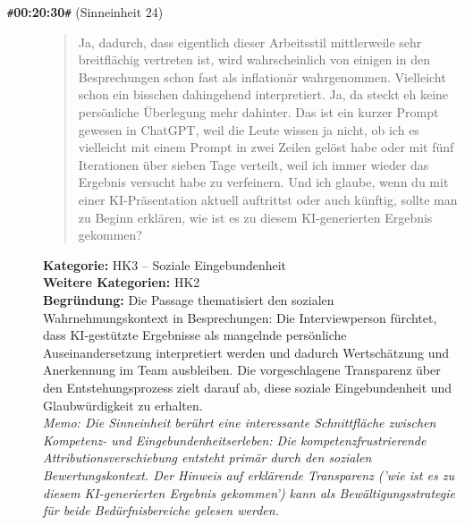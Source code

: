 \begin{description}
  \item[\texttt{\#}\textbf{00:20:30}\texttt{\#} (Sinneinheit 24)]
  \begin{quote}
  Ja, dadurch, dass eigentlich dieser Arbeitsstil mittlerweile sehr breitflächig vertreten ist, wird wahrscheinlich von einigen in den Besprechungen schon fast als inflationär wahrgenommen. Vielleicht schon ein bisschen dahingehend interpretiert. Ja, da steckt eh keine persönliche Überlegung mehr dahinter. Das ist ein kurzer Prompt gewesen in ChatGPT, weil die Leute wissen ja nicht, ob ich es vielleicht mit einem Prompt in zwei Zeilen gelöst habe oder mit fünf Iterationen über sieben Tage verteilt, weil ich immer wieder das Ergebnis versucht habe zu verfeinern. Und ich glaube, wenn du mit einer KI-Präsentation aktuell auftrittst oder auch künftig, sollte man zu Beginn erklären, wie ist es zu diesem KI-generierten Ergebnis gekommen?
  \end{quote}
  \textbf{Kategorie:} HK3 -- Soziale Eingebundenheit\\
  \textbf{Weitere Kategorien:} HK2\\
  \textbf{Begr\"undung:} Die Passage thematisiert den sozialen Wahrnehmungskontext in Besprechungen: Die Interviewperson fürchtet, dass KI-gestützte Ergebnisse als mangelnde persönliche Auseinandersetzung interpretiert werden und dadurch Wertschätzung und Anerkennung im Team ausbleiben. Die vorgeschlagene Transparenz über den Entstehungsprozess zielt darauf ab, diese soziale Eingebundenheit und Glaubwürdigkeit zu erhalten.
  \\\textit{Memo: Die Sinneinheit berührt eine interessante Schnittfläche zwischen Kompetenz- und Eingebundenheitserleben: Die kompetenzfrustrierende Attributionsverschiebung entsteht primär durch den sozialen Bewertungskontext. Der Hinweis auf erklärende Transparenz ('wie ist es zu diesem KI-generierten Ergebnis gekommen') kann als Bewältigungsstrategie für beide Bedürfnisbereiche gelesen werden.}
\end{description}
\medskip

